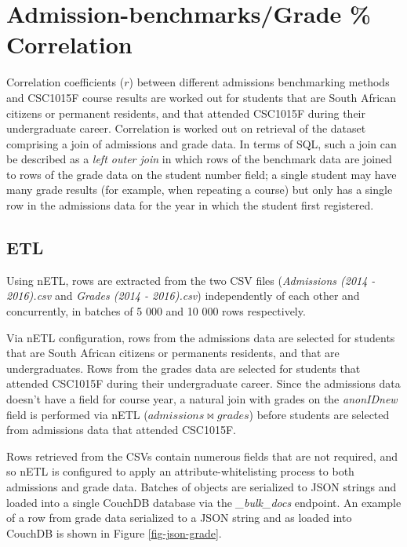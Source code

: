 \section{Admission-benchmarks/Grade \% Correlation}
Correlation coefficients ($r$) between different admissions benchmarking methods and CSC1015F course results are worked out for students that are South African citizens or permanent residents, and that attended CSC1015F during their undergraduate career. Correlation is worked out on retrieval of the dataset comprising a join of admissions and grade data. In terms of SQL, such a join can be described as a \textit{left outer join} in which rows of the benchmark data are joined to rows of the grade data on the student number field; a single student may have many grade results (for example, when repeating a course) but only has a single row in the admissions data for the year in which the student first registered.

\subsection{ETL}
Using nETL, rows are extracted from the two CSV files (\textit{Admissions (2014 - 2016).csv} and \textit{Grades (2014 - 2016).csv}) independently of each other and concurrently, in batches of 5 000 and 10 000 rows respectively.

Via nETL configuration, rows from the admissions data are selected for students that are South African citizens or permanents residents, and that are undergraduates. Rows from the grades data are selected for students that attended CSC1015F during their undergraduate career. Since the admissions data doesn't have a field for course year, a natural join with grades on the \textit{anonIDnew} field is performed via nETL ($admissions \bowtie grades$) before students are selected from admissions data that attended CSC1015F.

Rows retrieved from the CSVs contain numerous fields that are not required, and so nETL is configured to apply an attribute-whitelisting process to both admissions and grade data. Batches of objects are serialized to JSON strings and loaded into a single CouchDB database via the \textit{\_bulk\_docs} endpoint. An example of a row from grade data serialized to a JSON string and as loaded into CouchDB is shown in Figure \ref{fig-json-grade}.



